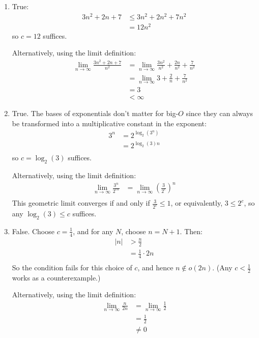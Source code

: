 \documentclass{article}
\theoremstyle{definition}
\theoremstyle{definition}
\theoremstyle{remark}
\begin{document}
\begin{enumerate}
    \item[$(i)$] True:
    \begin{align*}
        3n^2+2n+7&\leq3n^2+2n^2+7n^2\\
        &=12n^2
    \end{align*}
    so $c=12$ suffices.
    
    Alternatively, using the limit definition:
    \begin{align*}
        \lim_{n\rightarrow\infty}\frac{3n^2+2n+7}{n^2}&=\lim_{n\rightarrow\infty}\frac{3n^2}{n^2}+\frac{2n}{n^2}+\frac{7}{n^2}\\
        &=\lim_{n\rightarrow\infty}3+\frac{2}{n}+\frac{7}{n^2}\\
        &=3\\
        &<\infty
    \end{align*}
    
    \item[$(ii)$] True. The bases of exponentials don't matter for big-$O$ since they can always be transformed into a multiplicative constant in the exponent:
    \begin{align*}
        3^n&=2^{\log_2(3^n)}\\
        &=2^{\log_2(3)n}\\
    \end{align*}
    so $c=\log_2(3)$ suffices.

    Alternatively, using the limit definition:
    \begin{align*}
        \lim_{n\rightarrow\infty}\frac{3^n}{2^{cn}}&=\lim_{n\rightarrow\infty}\left(\frac{3}{2^c}\right)^n\\
    \end{align*}
    This geometric limit converges if and only if $\frac{3}{2^c}\leq1$, or equivalently, $3\leq2^c$, so any $\log_2(3)\leq c$ suffices.

    \item[$(iii)$] False. Choose $c=\frac{1}{4}$, and for any $N$, choose $n=N+1$. Then:
    \begin{align*}
        |n|&>\frac{n}{2}\\
        &=\frac{1}{4}\cdot 2n\\
    \end{align*}
    So the condition fails for this choice of $c$, and hence $n\notin o(2n)$. (Any $c<\frac{1}{2}$ works as a counterexample.)

    Alternatively, using the limit definition:
    \begin{align*}
        \lim_{n\rightarrow\infty}\frac{n}{2n}&=\lim_{n\rightarrow\infty}\frac{1}{2}\\
        &=\frac{1}{2}\\
        &\neq0
    \end{align*}
\end{enumerate}
\end{document}
